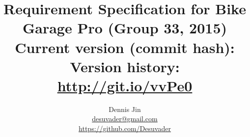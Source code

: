 \title{
	Requirement Specification for Bike Garage Pro (Group 33, 2015)\\
	\vspace{0.2in}
	\normalsize Current version (commit hash): \gitAbbrevHash\\
	\normalsize Version history: \url{http://git.io/vvPe0}
}
\author{
	Dennis Jin\\
	\url{desuvader@gmail.com}\\
	\url{https://github.com/Desuvader}\\
}
\date{}
